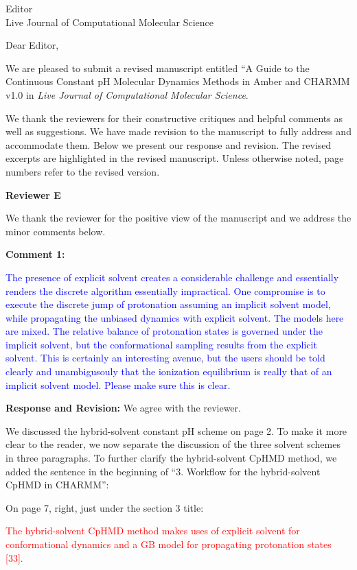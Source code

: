 \documentclass[11pt,letterpaper]{businessletter}
\begin{document}
\begin{letter}
{
Editor \\
Live Journal of Computational Molecular Science \\
}

\opening{Dear Editor,}
We are pleased to submit a revised manuscript entitled
``A Guide to the Continuous Constant pH Molecular Dynamics 
Methods in Amber and CHARMM v1.0
in \textit{Live Journal of Computational Molecular Science}.

We thank the reviewers for their constructive critiques
and helpful comments as well as suggestions. 
We have made revision to the manuscript to fully address and accommodate them.
Below we present our response and revision.  
The revised excerpts are highlighted in the 
revised manuscript. 
Unless otherwise noted, page numbers refer to the revised version.

\bigskip
{\large \bf Reviewer E}


We thank the reviewer for the positive view of the manuscript and we address the minor comments below.

\textbf{Comment 1:} 

\textcolor{Blue}{
The presence of explicit solvent creates a considerable challenge and essentially renders the discrete algorithm essentially impractical. One compromise is to execute the discrete jump of protonation assuming an implicit solvent model, while propagating the unbiased dynamics with explicit solvent. The models here are mixed. The relative balance of protonation states is governed under the implicit solvent, but the conformational sampling results from the explicit solvent. This is certainly an interesting avenue, but the users should be told clearly and unambigusouly that the ionization equilibrium is really that of an implicit solvent model. Please make sure this is clear.
}


\textbf{Response and Revision:} 
We agree with the reviewer. 

We discussed the hybrid-solvent constant pH scheme
on page 2. 
To make it more clear to the reader, we now separate the discussion of the three solvent schemes in three paragraphs.
To further clarify the hybrid-solvent CpHMD method, 
we added the sentence in the beginning of ``3. Workflow for the hybrid-solvent CpHMD in CHARMM'':

On page 7, right, just under the section 3 title:

\textcolor{red}{
The hybrid-solvent CpHMD method makes uses of explicit solvent 
for conformational dynamics and a GB model for propagating protonation states [33].
}


\end{letter}
\end{document}
